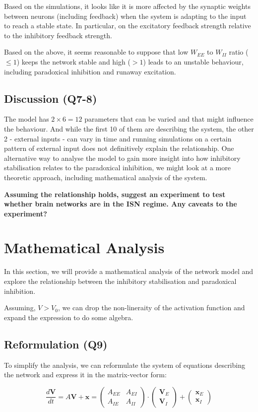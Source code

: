 \documentclass[10pt,twocolumn]{article}
\begin{document}
Based on the simulations, it looks like it is more
affected by the synaptic weights between neurons (including feedback)
 when the system is adapting to the input to reach a stable state. 
In particular, on the excitatory feedback strength relative to the 
inhibitory feedback strength.

Based on the above, it seems reasonable to suppose that 
low $W_{EE}$ to $W_{II}$ ratio ($\le1$)  keeps the network stable and 
high ($>1$) leads to an unstable behaviour, including paradoxical 
inhibition and runaway excitation.

\subsection{Discussion (Q7-8)}
The model has $2\times 6=12$ parameters that can be varied and that 
might influence the behaviour. And while the first 10 of them are 
describing the system, the other 2 - external inputs - can 
vary in time and running simulations on a certain pattern of 
external input does not definitively explain the relationship. 
One alternative way to analyse the model to gain more insight 
into how inhibitory stabilisation relates to the paradoxical inhibition, 
we might look at a more theoretic approach, including 
mathematical analysis of the system. 

\textbf{Assuming the relationship holds, suggest an experiment
to test whether brain networks are in the ISN regime.
Any caveats to the experiment?}

\section{Mathematical Analysis}
In this section, we will provide a mathematical analysis
of the network model and explore the relationship between
the inhibitory stabilisation and paradoxical inhibition.

Assuming, $V > V_0$, we can drop the non-lineraity of the activation
function and expand the expression to do some algebra.

\subsection{Reformulation (Q9)}
To simplify the analysis, we can reformulate the system
of equations describing the network and
express it in the matrix-vector form:

$$
    \frac{d\textbf{V}}{dt}
    = A\textbf{V} + \textbf{x}
    =
    \begin{pmatrix}
        A_{EE} & A_{EI} \\
        A_{IE} & A_{II}
    \end{pmatrix}
    \cdot \begin{pmatrix} \textbf{V}_E \\ \textbf{V}_I \end{pmatrix}
    + \begin{pmatrix} \textbf{x}_E \\ \textbf{x}_I \end{pmatrix}
$$
\end{document}
